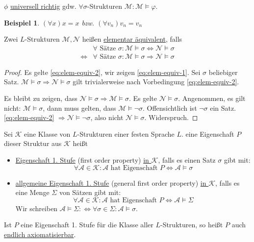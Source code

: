 \documentclass{article}
\theoremstyle{definition}
\theoremstyle{plain}
\newtheorem*{bsp}{Beispiel}
\newcommand{\calA}{\mathcal{A}}
\newcommand{\calK}{\mathcal{K}}
\newcommand{\calM}{\mathcal{M}}
\newcommand{\calN}{\mathcal{N}}
\begin{document}
    $ \phi $ \underline{universell richtig} gdw. $ \forall \sigma$-Strukturen $ \calM: \calM \models \varphi $.
    \begin{bsp}
        $ (\forall x) x = x $ bzw. $ (\forall v_n) v_n = v_n $
    \end{bsp}

    Zwei $ L $-Strukturen $ \calM, \calN $ heißen \underline{elementar äquivalent}, falls
    \begin{align}
        & \forall \text{ Sätze } \sigma: \calM \models \sigma \Leftrightarrow \calN \models \sigma \label{eq:elem-equiv-1} \\
        \Leftrightarrow & \forall \text{ Sätze } \sigma: \calM \models \sigma \Rightarrow \calN \models \sigma \label{eq:elem-equiv-2}
    \end{align}

    \begin{proof}
        Es gelte \eqref{eq:elem-equiv-2}, wir zeigen \eqref{eq:elem-equiv-1}.
        Sei $ \sigma $ beliebiger Satz.
        $ \calM \models \sigma \Rightarrow \calN \models \sigma $
        gilt trivialerweise nach Vorbedingung \eqref{eq:elem-equiv-2}.

        Es bleibt zu zeigen, dass $ \calN \models \sigma \Rightarrow \calM \models \sigma $.
        Es gelte $ \calN \models \sigma $.
        Angenommen, es gilt nicht: $ \calM \models \sigma $, dann muss gelten, dass $ \calM \models \neg \sigma $.
        Offensichtlich ist $ \neg \sigma $ ein Satz.
        \eqref{eq:elem-equiv-2} $ \Rightarrow \calN \models \neg \sigma $, also nicht $ \calN \models \sigma $. Widerspruch.
    \end{proof}

    Sei $ \calK $ eine Klasse von $ L $-Strukturen einer festen Sprache $ L $.
    eine Eigenschaft $ P$ dieser Struktur aus $ \calK $ heißt
    \begin{itemize}
        \item \underline{Eigenschaft 1. Stufe} (first order property) \underline{in $ \calK $}, falls es einen Satz $ \sigma $ gibt mit:
        \begin{equation*}
            \forall \calA \in \calK : \calA \text{ hat Eigenschaft } P \Leftrightarrow \calA \models \sigma
        \end{equation*}
        \item \underline{allgemeine Eigenschaft 1. Stufe} (general first order property) \underline{in $ \calK $}, falls es eine Menge $ \Sigma $ von Sätzen gibt mit:
        \begin{equation*}
            \forall \calA \in \calK : \calA \text{ hat Eigenschaft } P \Leftrightarrow \calA \models \Sigma
        \end{equation*}
        Wir schreiben $ \calA \models \Sigma :\Leftrightarrow \forall \sigma \in \Sigma: \calA \models \sigma $.
    \end{itemize}
    Ist $ P $ eine Eigenschaft 1. Stufe für die Klasse aller $ L $-Strukturen, so heißt $ P $ auch \underline{endlich axiomatisierbar}.
\end{document}
